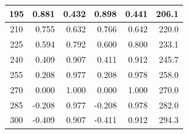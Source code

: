 \begin{table}[htbp]
\begin{center}
\begin{tabular}{|p{15 mm}|p{15 mm}|p{15 mm}|p{15 mm}|p{15 mm}|p{15 mm}|}
      \multicolumn{1}{|c|}{195}                  & \multicolumn{1}{|r|}{0.881}                                   & \multicolumn{1}{|r|}{0.432}                                   & \multicolumn{1}{|r|}{0.898}                & \multicolumn{1}{|r|}{0.441}                & \multicolumn{1}{|r|}{206.1}                    \\ \hline
      \multicolumn{1}{|c|}{210}                  & \multicolumn{1}{|r|}{0.755}                                   & \multicolumn{1}{|r|}{0.632}                                   & \multicolumn{1}{|r|}{0.766}                & \multicolumn{1}{|r|}{0.642}                & \multicolumn{1}{|r|}{220.0}                    \\ \hline
      \multicolumn{1}{|c|}{225}                  & \multicolumn{1}{|r|}{0.594}                                   & \multicolumn{1}{|r|}{0.792}                                   & \multicolumn{1}{|r|}{0.600}                & \multicolumn{1}{|r|}{0.800}                & \multicolumn{1}{|r|}{233.1}                    \\ \hline
      \multicolumn{1}{|c|}{240}                  & \multicolumn{1}{|r|}{0.409}                                   & \multicolumn{1}{|r|}{0.907}                                   & \multicolumn{1}{|r|}{0.411}                & \multicolumn{1}{|r|}{0.912}                & \multicolumn{1}{|r|}{245.7}                    \\ \hline
      \multicolumn{1}{|c|}{255}                  & \multicolumn{1}{|r|}{0.208}                                   & \multicolumn{1}{|r|}{0.977}                                   & \multicolumn{1}{|r|}{0.208}                & \multicolumn{1}{|r|}{0.978}                & \multicolumn{1}{|r|}{258.0}                    \\ \hline
      \multicolumn{1}{|c|}{270}                  & \multicolumn{1}{|r|}{0.000}                                   & \multicolumn{1}{|r|}{1.000}                                   & \multicolumn{1}{|r|}{0.000}                & \multicolumn{1}{|r|}{1.000}                & \multicolumn{1}{|r|}{270.0}                    \\ \hline
      \multicolumn{1}{|c|}{285}                  & \multicolumn{1}{|r|}{-0.208}                                  & \multicolumn{1}{|r|}{0.977}                                   & \multicolumn{1}{|r|}{-0.208}               & \multicolumn{1}{|r|}{0.978}                & \multicolumn{1}{|r|}{282.0}                    \\ \hline
      \multicolumn{1}{|c|}{300}                  & \multicolumn{1}{|r|}{-0.409}                                  & \multicolumn{1}{|r|}{0.907}                                   & \multicolumn{1}{|r|}{-0.411}               & \multicolumn{1}{|r|}{0.912}                & \multicolumn{1}{|r|}{294.3}                    \\ \hline

\end{tabular}
\end{center}
\end{table}
